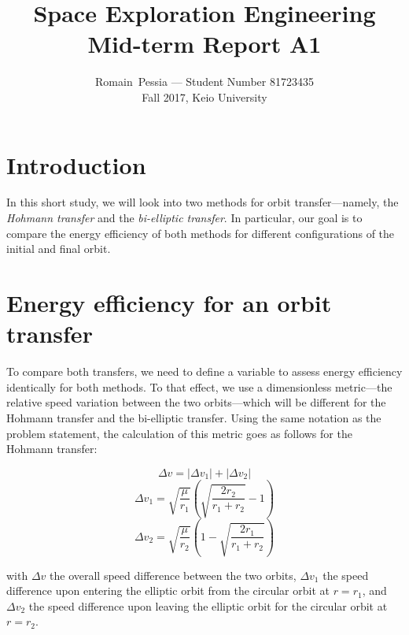\documentclass[journal]{IEEEtran}
\begin{document}
\title{Space Exploration Engineering\\
Mid-term Report A1}

\author{Romain~Pessia — Student Number 81723435 \\
Fall 2017, Keio University }%

\maketitle

\section*{Introduction}

In this short study, we will look into two methods for orbit transfer---namely, the \textit{Hohmann transfer} and the \textit{bi-elliptic transfer}. In particular, our goal is to compare the energy efficiency of both methods for different configurations of the initial and final orbit.

\section*{Energy efficiency for an orbit transfer}

To compare both transfers, we need to define a variable to assess energy efficiency identically for both methods. To that effect, we use a dimensionless metric---the relative speed variation between the two orbits---which will be different for the Hohmann transfer and the bi-elliptic transfer. Using the same notation as the problem statement, the calculation of this metric goes as follows for the Hohmann transfer:

\begin{equation}
    \Delta v = \left|\Delta v_1 \right| + \left|\Delta v_2 \right|
\end{equation}
\begin{equation}
    \Delta v_1 = \sqrt{\frac{\mu}{r_1}}\left( \sqrt{\frac{2r_2}{r_1+r_2}} -1 \right)
\end{equation}
\begin{equation}
    \Delta v_2 = \sqrt{\frac{\mu}{r_2}}\left( 1- \sqrt{\frac{2r_1}{r_1+r_2}} \right)
\end{equation}

with $\Delta v$ the overall speed difference between the two orbits, $\Delta v_1$ the speed difference upon entering the elliptic orbit from the circular orbit at $r=r_1$, and $\Delta v_2$ the speed difference upon leaving the elliptic orbit for the circular orbit at $r=r_2$.
\end{document}
